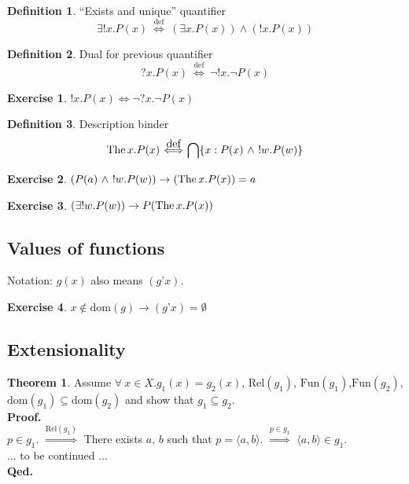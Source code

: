\documentclass[10pt,a4paper]{article}
\theoremstyle{definition}
\newtheorem{definition}{Definition}[section]
\newtheorem{theorem}{Theorem}[section]
\newtheorem{exercise}{Exercise}[section]
\newcommand{\Fun}{{\mbox{Fun}}}
\newcommand{\Rel}{{\mbox{Rel}}}
\newcommand{\dom}{{\mbox{dom}}}
\newcommand{\apo}{{\mbox{'}}}  %
\newcommand{\The}{{\mbox{The\,}}}
\newcommand{\LRA}{\Longleftrightarrow}
\newcommand{\defi}{{\mbox{def}}}
\newcommand{\propdef}{{\stackrel{\defi}{\ \Longleftrightarrow\ }}}
\newcommand{\inter}{{\bigcap}}
\newcommand{\myprf}{\noindent\textbf{Proof.}}
\newcommand{\myqed}{\noindent\textbf{Qed.}}
\begin{document}
\begin{definition} ``Exists and unique'' quantifier
$$\exists !x. P(x) \propdef (\exists x. P(x))\land(!x. P(x))$$
\end{definition}

\begin{definition}  Dual for previous quantifier 
$$?x. P(x) \propdef \neg !x. \neg P(x)$$
\end{definition}

\begin{exercise}
$!x. P(x) \LRA \neg ?x. \neg P(x)$
\end{exercise}

\begin{definition} Description binder
$$\The x. P(x) \propdef \inter \{x:P(x)\ \land\ !w.P(w)\}$$
\end{definition}

\begin{exercise}
$(P(a)\ \land\ !w.P(w)) \rightarrow (\The x. P(x))=a$
\end{exercise}

\begin{exercise}
$(\exists !w.P(w)) \rightarrow P(\The x. P(x))$
\end{exercise}

\subsection{Values of functions}
Notation: $g(x)$ also means $(g\apo x).$\\

\begin{exercise}
$x\notin \dom(g)\to (g\apo x)=\emptyset$
\end{exercise}

\subsection{Extensionality}
\begin{theorem}
Assume $\forall~x\in X. g_1(x)=g_2(x)$, $\Rel(g_1)$, $\Fun(g_1)$,$\Fun(g_2)$,\\ $\dom(g_1)\subseteq\dom(g_2)$ and show that $g_1\subseteq g_2$.\\
\myprf\\
$p\in g_1$.
$\stackrel{\Rel(g_1)}{\Longrightarrow}$
There exists $a$, $b$ such that $p=\langle a, b\rangle$.
$\stackrel{p\in g_1}{\Longrightarrow}$ $\langle a, b\rangle\in g_1$.
\\
... to be continued ...
\\\myqed 
\end{theorem}
\end{document}
